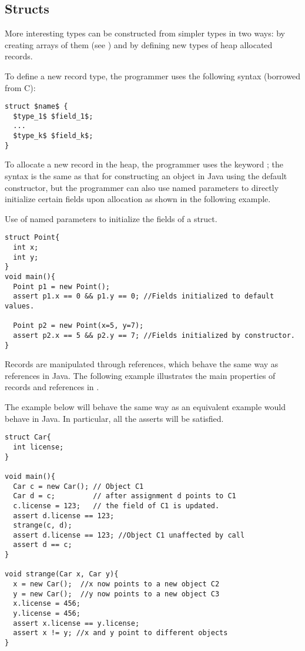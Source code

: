 \subsection{Structs}
More interesting types can be constructed from simpler types in two ways: by creating arrays of them (see ) and by defining new types of heap allocated records.

To define a new record type, the programmer uses the following syntax (borrowed from C):
\begin{lstlisting}
struct $name$ {
  $type_1$ $field_1$;
  ...
  $type_k$ $field_k$;
}
\end{lstlisting}

To allocate a new record in the heap, the programmer uses the keyword ; the syntax is the same as that for constructing an object in Java using the default constructor, but the programmer can also use named parameters to directly initialize certain fields upon allocation as shown in the following example.

\begin{Example}
Use of named parameters to initialize the fields of a struct.
\begin{lstlisting}
struct Point{
  int x;
  int y;
}
void main(){
  Point p1 = new Point();
  assert p1.x == 0 && p1.y == 0; //Fields initialized to default values.

  Point p2 = new Point(x=5, y=7);
  assert p2.x == 5 && p2.y == 7; //Fields initialized by constructor.
}
\end{lstlisting}
\end{Example}

Records are manipulated through references, which behave the same way as references in Java. The following example illustrates the main properties of records and references in \Sk{}.

\begin{Example}
The example below will behave the same way as an equivalent example would behave in Java. In particular, all the asserts will be satisfied.
\begin{lstlisting}
struct Car{
  int license;
}

void main(){
  Car c = new Car(); // Object C1
  Car d = c;         // after assignment d points to C1
  c.license = 123;   // the field of C1 is updated.
  assert d.license == 123;
  strange(c, d);
  assert d.license == 123; //Object C1 unaffected by call
  assert d == c;
}

void strange(Car x, Car y){
  x = new Car();  //x now points to a new object C2
  y = new Car();  //y now points to a new object C3
  x.license = 456;
  y.license = 456;
  assert x.license == y.license;
  assert x != y; //x and y point to different objects
}
\end{lstlisting}

\end{Example}

